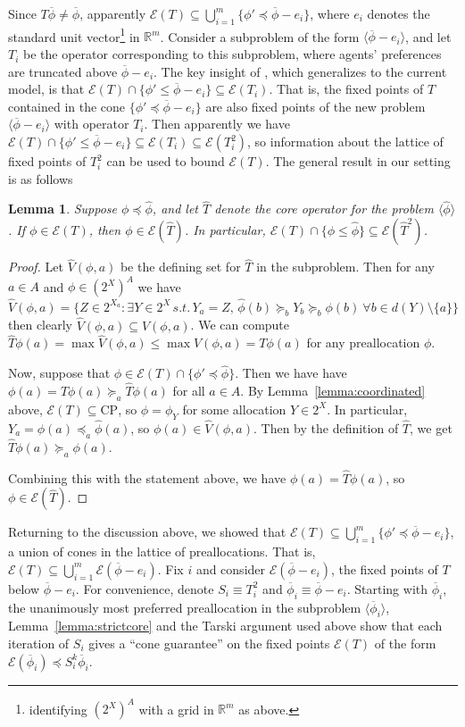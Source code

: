 \documentclass[11pt,reqno]{amsart}
\newtheorem{lemma}[thm]{Lemma}
\theoremstyle{definition}
\numberwithin{equation}{section}
\newcommand{\prf}{\begin{proof}}
\newcommand{\eprf}{\end{proof}}
\newcommand{\wh}{\widehat}
\newcommand{\mr}{\mathbb{R}}
\newcommand{\ol}{\overline}
\newcommand{\lag}{\langle}
\newcommand{\rag}{\rangle}
\newcommand{\pre}{\phi}
\newcommand{\coordpre}{\mathrm{CP}}
\newcommand{\prealloc}{(2^X)^A}
\newcommand{\sub}{\subseteq}
\newcommand{\fix}{\mathcal{E}}
\newcommand{\suq}{\succeq}
\newcommand{\peq}{\preceq}
\newcommand{\toppre}{\ol{\pre}}
\begin{document}
Since $T\toppre \not = \toppre$, apparently $\fix(T) \sub \bigcup_{i = 1}^m \{\pre' \peq \toppre - e_i\}$, where $e_i$ denotes the standard unit vector\footnote{identifying $\prealloc$ with a grid in $\mr^m$ as above.} in $\mr^m$. 
Consider a subproblem of the form $\lag \toppre - e_i \rag$, and let $T_i$ be the operator corresponding to this subproblem, where agents' preferences are truncated above $\toppre - e_i$.
The key insight of \cite{Echenique2007Equilibria}, which generalizes to the current model, is that $\fix(T) \cap \{\pre' \leq \toppre - e_i\} \sub \fix(T_i)$.
That is, the fixed points of $T$ contained in the cone $\{\pre' \peq \toppre - e_i\}$ are also fixed points of the new problem $\lag \toppre - e_i \rag$ with operator $T_i$. 
Then apparently we have $\fix(T) \cap \{\pre' \leq \toppre - e_i\} \sub \fix(T_i) \sub \fix(T_i^2)$, so information about the lattice of fixed points of $T_i^2$ can be used to bound $\fix(T)$.
The general result in our setting is as follows 
\begin{lemma} \label{lemma:contain}
Suppose $\pre \peq \wh{\pre}$, and let $\wh{T}$ denote the core operator for the problem $\lag \wh{\pre} \rag$.
If $\pre \in \fix(T)$, then $\pre \in \fix(\wh{T})$.
In particular, $\fix(T) \cap \{\pre \leq \wh{\pre}\} \sub \fix(\wh{T}^2)$. 
\end{lemma}
\prf
Let $\wh{V}(\pre, a)$ be the defining set for $\wh{T}$ in the subproblem.
Then for any $a \in A$ and $\pre \in \prealloc$ we have 
$\wh{V}(\pre,a)  = \{Z \in 2^{X_a}: \exists Y \in 2^X \, s.t. \,  Y_a = Z, \, \wh{\pre}(b) \suq_b Y_b \suq_b \pre(b) \: \forall b \in d(Y)\setminus\{a\} \}$
then clearly $\wh{V}(\pre,a) \sub V(\pre,a)$.  
We can compute $\wh{T}\pre(a) = \max \wh{V}(\pre,a) \leq \max V(\pre,a) = T\pre(a)$ for any preallocation $\pre$. 

Now, suppose that $\pre \in \fix(T)\cap\{\pre' \peq \wh{\pre}\}$.
Then we have have $\pre(a) = T\pre(a) \suq_a \wh{T}\pre(a)$ for all $a \in A$. 
By Lemma~\ref{lemma:coordinated} above, $\fix(T) \sub \coordpre$, so $\pre = \pre_Y$ for some allocation $Y \in 2^X$.
In particular, $Y_a = \pre(a) \peq_a \wh{\pre}(a)$, so $\pre(a) \in \wh{V}(\pre,a)$.
Then by the definition of $\wh{T}$, we get $\wh{T}\pre(a) \suq_a \pre(a)$. 

Combining this with the statement above, we have $\pre(a) = \wh{T} \pre(a)$, so $\pre \in \fix(\wh{T})$. 
\eprf 
Returning to the discussion above, we showed that $\fix(T) \sub \bigcup_{i = 1}^m \{\pre' \peq \toppre - e_i\}$, a union of cones in the lattice of preallocations. 
That is, $\fix(T) \sub \bigcup_{i = 1}^m \fix(\toppre - e_i)$.
Fix $i$ and consider $\fix(\toppre - e_i)$, the fixed points of $T$ below $\toppre - e_i$.
For convenience, denote $S_i \equiv T_i^2$ and $\toppre_i \equiv \toppre - e_i$.
Starting with $\toppre_i$, the unanimously most preferred preallocation in the subproblem $\lag \toppre_i \rag$, Lemma~\ref{lemma:strictcore} and the Tarski argument used above show that each iteration of $S_i$ gives a ``cone guarantee'' on the fixed points $\fix(T)$ of the form $\fix(\toppre_i) \peq S_i^k \toppre_i$.
\end{document}
